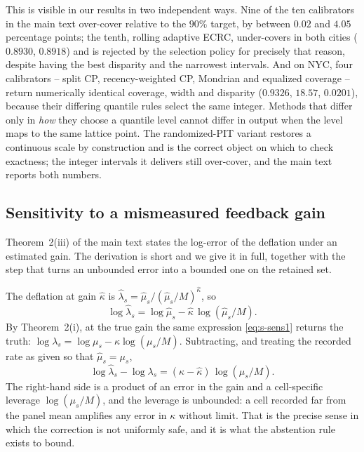 \documentclass[journal,10pt,onecolumn]{IEEEtran}
\begin{document}
This is visible in our results in two independent ways. Nine of the ten
calibrators in the main text over-cover relative to the $90\%$ target, by between
$0.02$ and $4.05$ percentage points; the tenth, rolling adaptive ECRC, under-covers
in both cities ($0.8930$, $0.8918$) and is rejected by the selection policy for
precisely that reason, despite having the best disparity and the narrowest
intervals. And on NYC, four calibrators -- split CP, recency-weighted CP,
Mondrian and equalized coverage -- return numerically identical coverage, width
and disparity ($0.9326$, $18.57$, $0.0201$), because their differing quantile
rules select the same integer. Methods that differ only in \emph{how} they choose
a quantile level cannot differ in output when the level maps to the same lattice
point. The randomized-PIT variant restores a continuous scale by construction and
is the correct object on which to check exactness; the integer intervals it
delivers still over-cover, and the main text reports both numbers.

\subsection{Sensitivity to a mismeasured feedback gain}
\label{sec:s1-sensitivity}

Theorem~2(iii) of the main text states the log-error of the deflation under an
estimated gain. The derivation is short and we give it in full, together with the
step that turns an unbounded error into a bounded one on the retained set.

The deflation at gain $\hat{\kappa}$ is
$\hat{\lambda}_s = \hat{\mu}_s / (\hat{\mu}_s/M)^{\hat\kappa}$, so
\begin{equation}
\label{eq:s-sens1}
\log\hat{\lambda}_s = \log\hat{\mu}_s - \hat\kappa\,\log(\hat{\mu}_s/M).
\end{equation}
By Theorem~2(i), at the true gain the same expression \eqref{eq:s-sens1} returns
the truth:
$\log\lambda_s = \log\mu_s - \kappa\log(\mu_s/M)$. Subtracting, and treating the
recorded rate as given so that $\hat\mu_s = \mu_s$,
\begin{equation}
\label{eq:s-sens2}
\log\hat{\lambda}_s - \log\lambda_s
= (\kappa - \hat\kappa)\,\log\!\left(\mu_s/M\right).
\end{equation}
The right-hand side is a product of an error in the gain and a cell-specific
leverage $\log(\mu_s/M)$, and the leverage is unbounded: a cell recorded far from
the panel mean amplifies any error in $\kappa$ without limit. That is the precise
sense in which the correction is not uniformly safe, and it is what the abstention
rule exists to bound.
\end{document}
